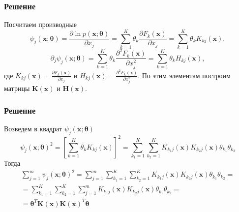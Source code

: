 \documentclass{beamer}
\begin{document}
\begin{frame}
    \frametitle{Решение}
    Посчитаем производные 
    \begin{equation*}
        \psi_j(\boldsymbol{x}; \boldsymbol{\theta}) = \frac{\partial \ln p(\boldsymbol{x}; \boldsymbol{\theta})}{\partial x_j} = \sum_{k=1}^K \theta_k \frac{\partial F_k(\boldsymbol{x})}{\partial x_j} = \sum_{k=1}^K \theta_k K_{kj}(\boldsymbol{x}),
    \end{equation*}
    \begin{equation*}
        \partial_j \psi_j(\boldsymbol{x}; \boldsymbol{\theta}) = \sum_{k=1}^K \theta_k \frac{\partial^2 F_k(\boldsymbol{x})}{\partial x_j^2} = \sum_{k=1}^K 
        \theta_k H_{kj}(\boldsymbol{x}), 
    \end{equation*}
    где $K_{kj}(\boldsymbol{x}) = \frac{\partial F_k(\boldsymbol{x})}{\partial x_j}$ и $H_{kj}(\boldsymbol{x}) = \frac{\partial^2 F_k(\boldsymbol{x})}{\partial x_j^2}$.
    По этим элементам построим матрицы $\boldsymbol{K}(\boldsymbol{x})$ и $\boldsymbol{H}(\boldsymbol{x})$.
\end{frame}


\begin{frame}
    \frametitle{Решение}
    Возведем в квадрат $\psi_j(\boldsymbol{x}; \boldsymbol{\theta})$
    \begin{equation}
        \psi_j(\boldsymbol{x}; \boldsymbol{\theta})^2 = \left[ \sum_{k=1}^K \theta_k K_{kj}(\boldsymbol{x}) \right]^2 = \sum_{k_1=1}^K \sum_{k_2=1}^K K_{k_1j}(\boldsymbol{x}) K_{k_2j}(\boldsymbol{x}) \theta_{k_1} \theta_{k_2}
    \end{equation}
    Тогда 
    \begin{multline}
        \sum_{j=1}^m \psi_j(\boldsymbol{x}; \boldsymbol{\theta})^2 = 
        \sum_{j=1}^m \sum_{k_1=1}^K \sum_{k_2=1}^K K_{k_1j}(\boldsymbol{x}) K_{k_2j}(\boldsymbol{x}) \theta_{k_1} \theta_{k_2} = \\ =
        \sum_{k_1=1}^K \sum_{k_2=1}^K \sum_{j=1}^m K_{k_1j}(\boldsymbol{x}) K_{k_2j}(\boldsymbol{x}) \theta_{k_1} \theta_{k_2} = \\ = \boldsymbol{\theta}^T \boldsymbol{K}(\boldsymbol{x}) \boldsymbol{K}(\boldsymbol{x})^T \boldsymbol{\theta}
    \end{multline}
\end{frame}
\end{document}
